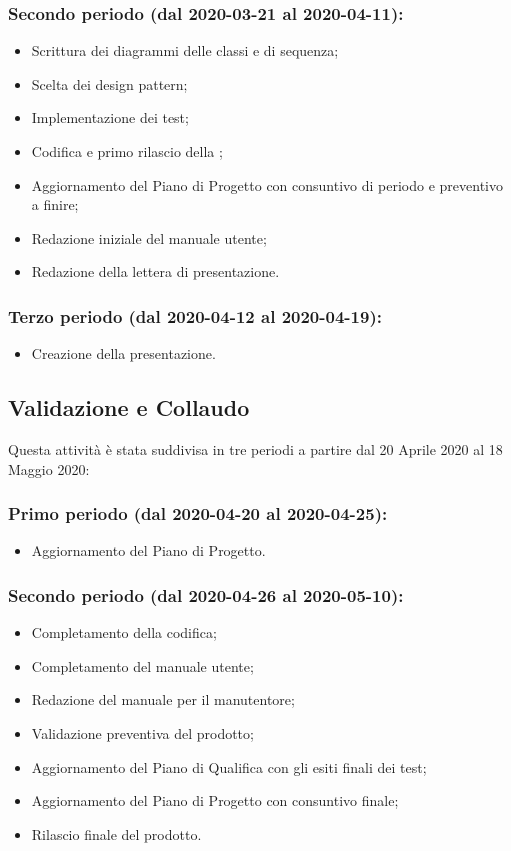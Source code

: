 		\subsubsection{Secondo periodo (dal 2020-03-21 al 2020-04-11):}
			\begin{itemize}
				\item Scrittura dei diagrammi delle classi e di sequenza;
				\item Scelta dei design pattern;
				\item Implementazione dei test;
				\item Codifica e primo rilascio della ;
				\item Aggiornamento del Piano di Progetto con consuntivo di periodo e preventivo a finire;
				\item Redazione iniziale del manuale utente;
				\item Redazione della lettera di presentazione.
			\end{itemize}

		\subsubsection{Terzo periodo (dal 2020-04-12 al 2020-04-19):}
			\begin{itemize}
				\item Creazione della presentazione.
			\end{itemize}
	
	\subsection{Validazione e Collaudo}		
	Questa attività è stata suddivisa in tre periodi a partire dal 20 Aprile 2020 al 18 Maggio 2020:

		\subsubsection{Primo periodo (dal 2020-04-20 al 2020-04-25):}
			\begin{itemize}
			 	\item Aggiornamento del Piano di Progetto.
			\end{itemize} 	
		
		\subsubsection{Secondo periodo (dal 2020-04-26 al 2020-05-10):}
			\begin{itemize}
				\item Completamento della codifica;
				\item Completamento del manuale utente;
				\item Redazione del manuale per il manutentore;
				\item Validazione preventiva del prodotto;
				\item Aggiornamento del Piano di Qualifica con gli esiti finali dei test;
				\item Aggiornamento del Piano di Progetto con consuntivo finale;
				\item Rilascio finale del prodotto.
			\end{itemize}

